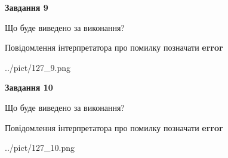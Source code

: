 \documentclass[12pt, ukrainian]{article}
\begin{document}
{{\begin {center}\textbf{Завдання 9}\end {center}}\par
Що буде виведено за виконання? \par
Повідомлення інтерпретатора про помилку позначати \textbf{error}

\begin{center}
	{../pict/127_9.png}
\end{center}
\newpage

{\begin {center}\textbf{Завдання 10}\end {center}}\par
Що буде виведено за виконання? \par
Повідомлення інтерпретатора про помилку позначати \textbf{error}

\begin{center}
	{../pict/127_10.png}
\end{center}
\newpage

}
\end{document}
